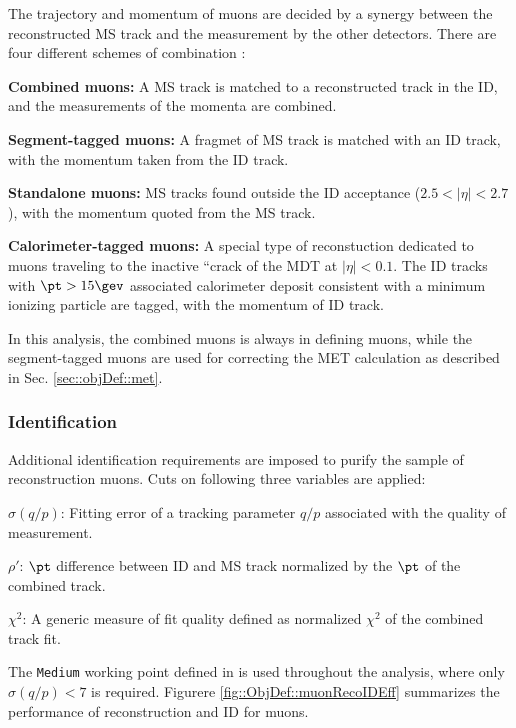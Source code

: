 The trajectory and momentum of muons are decided by a synergy between the reconstructed MS track and the measurement by the other detectors.
There are four different schemes of combination \cite{165_muonPerf2011_2012}:
\begin{description}
\item \textbf{Combined muons:} 
A MS track is matched to a reconstructed track in the ID, and the measurements of the momenta are combined.

\item \textbf{Segment-tagged muons:} 
  A fragmet of MS track is matched with an ID track, with the momentum taken from the ID track.

\item \textbf{Standalone muons:} 
  MS tracks found outside the ID acceptance ($2.5 < |\eta| < 2.7$), with the momentum quoted from the MS track.

\item \textbf{Calorimeter-tagged muons:}
  A special type of reconstuction dedicated to muons traveling to the inactive “crack of the MDT at $|\eta|<0.1$.
  The ID tracks with $\pt>15\gev$ associated calorimeter deposit consistent with a minimum ionizing particle are tagged, with the momentum of ID track.
\end{description}
In this analysis, the combined muons is always in defining muons, while the segment-tagged muons are used for correcting the MET calculation as described in Sec. \ref{sec::objDef::met}.\\



\subsubsection{Identification} \label{sec::objDef::muons::id}
Additional identification requirements are imposed to purify the sample of reconstruction muons.
Cuts on following three variables are applied:
\begin{description}
\item $\sigma(q/p)$: Fitting error of a tracking parameter $q/p$ associated with the quality of measurement. \\
\item $\rho'$:     \mbox{\phantom{MM}}  $\pt$ difference between ID and MS track normalized by the $\pt$ of the combined track. \\
\item $\chi^2$:   \mbox{\phantom{MM}}  
  A generic measure of fit quality defined as normalized $\chi^2$ of the combined track fit.
\end{description}
The \texttt{Medium} working point defined in \cite{166_muonPerformance2015data} is used throughout the analysis, 
where only $\sigma(q/p)<7$ is required.  
Figurere \ref{fig::ObjDef::muonRecoIDEff} summarizes the performance of reconstruction and ID for muons.\\

